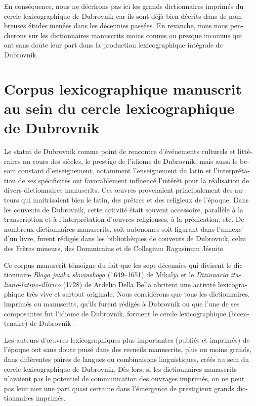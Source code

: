 \documentclass[output=paper,colorlinks,citecolor=brown,arabicfont,chinesefont,booklanguage=french]{langscibook}
\begin{document}
\begin{otherlanguage}{french}
En conséquence, nous ne décrirons pas ici les grands dictionnaires imprimés du cercle lexicographique de Dubrovnik car ils sont déjà bien décrits dans de nombreuses études menées dans les décennies passées. En revanche, nous nous pencherons sur les dictionnaires manuscrits moins connus ou presque inconnus qui ont sans doute leur part dans la production lexicographique intégrale de Dubrovnik. 

\section{Corpus lexicographique manuscrit au sein du cercle lexicographique de Dubrovnik}

Le statut de Dubrovnik comme point de rencontre d’événements culturels et littéraires au cours des siècles, le prestige de l’idiome de Dubrovnik, mais aussi le besoin constant d’enseignement, notamment l’enseignement du latin et l’interprétation de ses spécificités ont favorablement influencé l’intérêt pour la réalisation de divers dictionnaires manuscrits. Ces œuvres provenaient principalement des auteurs qui maitrisaient bien le latin, des prêtres et des religieux de l’époque. Dans les couvents de Dubrovnik, cette activité était souvent accessoire, parallèle à la transcription et à l’interprétation d’œuvres religieuses, à la prédication, etc. De nombreux dictionnaires manuscrits, soit autonomes soit figurant dans l’annexe d’un livre, furent rédigés dans les bibliothèques de couvents de Dubrovnik, celui des Frères mineurs, des Dominicains et de Collegium Ragusinum Jésuite.

Ce corpus manuscrit témoigne du fait que les sept décennies qui divisent le dictionnaire \emph{Blago jezika slovinskoga} (1649--1651) de Mikalja et le \emph{Dizionario italiano-latino-illirico} (1728) de Ardelio Della Bella abritent une activité lexicographique très vive et surtout originale. Nous considérons que tous les dictionnaires, imprimés ou manuscrits, qu’ils furent rédigés à Dubrovnik ou que l’une de ses composantes fut l’idiome de Dubrovnik, forment le cercle lexicographique (bicentenaire) de Dubrovnik. 

Les auteurs d’œuvres lexicographiques plus importantes (publiés et imprimés) de l’époque ont sans doute puisé dans des recueils manuscrits, plus ou moins grands, dans différentes paires de langues ou combinaisons linguistiques, créés au sein du cercle lexicographique de Dubrovnik. Dès lors, si les dictionnaires manuscrits n’avaient pas le potentiel de communication des ouvrages imprimés, on ne peut pas leur nier une part quasi certaine dans l’émergence de prestigieux grands dictionnaires imprimés. 


\end{otherlanguage}
\end{document}
